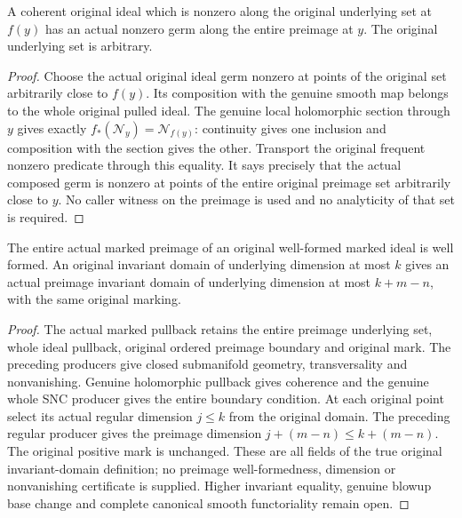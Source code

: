 \begin{theorem}
\label{hir:submersion-relative-nonzero}
A coherent original ideal which is nonzero along the original underlying
set at $f(y)$ has an actual nonzero germ along the entire preimage at $y$.
The original underlying set is arbitrary.
\end{theorem}
\begin{proof}
Choose the actual original ideal germ nonzero at points of the original
set arbitrarily close to $f(y)$. Its composition with the genuine smooth
map belongs to the whole original pulled ideal. The genuine local
holomorphic section through $y$ gives exactly
$f_*(\mathcal N_y)=\mathcal N_{f(y)}$: continuity gives one inclusion
and composition with the section gives the other. Transport the original
frequent nonzero predicate through this equality. It says precisely that
the actual composed germ is nonzero at points of the entire original
preimage set arbitrarily close to $y$. No caller witness on the preimage
is used and no analyticity of that set is required.
\end{proof}
\leanok

\begin{theorem}
\label{hir:submersion-relative-invariant-domain}
The entire actual marked preimage of an original well-formed marked
ideal is well formed. An original invariant domain of underlying
dimension at most $k$ gives an actual preimage invariant domain of
underlying dimension at most $k+m-n$, with the same original marking.
\end{theorem}
\begin{proof}
The actual marked pullback retains the entire preimage underlying set,
whole ideal pullback, original ordered preimage boundary and original
mark. The preceding producers give closed submanifold geometry,
transversality and nonvanishing. Genuine holomorphic pullback gives
coherence and the genuine whole SNC producer gives the entire boundary
condition. At each original point select its actual regular dimension
$j\le k$ from the original domain. The preceding regular producer gives
the preimage dimension $j+(m-n)\le k+(m-n)$. The original positive mark
is unchanged. These are all fields of the true original invariant-domain
definition; no preimage well-formedness, dimension or nonvanishing
certificate is supplied. Higher invariant equality, genuine blowup
base change and complete canonical smooth functoriality remain open.
\end{proof}
\leanok
